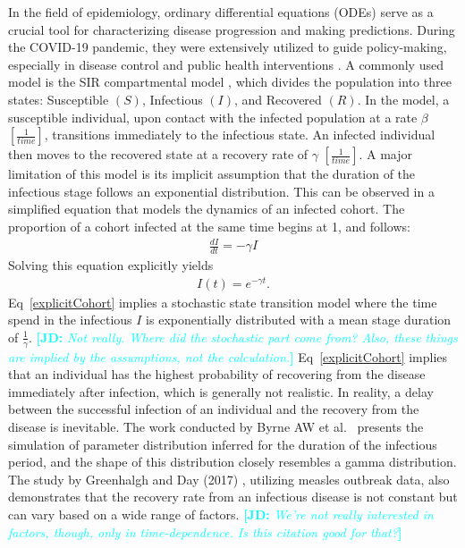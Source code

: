 \documentclass[12pt]{article}
\newcommand{\Eqnref}[1]{Eq~\ref{#1}}
\newcommand{\comment}{\showcomment}
\newcommand{\showcomment}[3]{\textcolor{#1}{\textbf{[#2: }\textsl{#3}\textbf{]}}}
\newcommand{\jd}[1]{\comment{cyan}{JD}{#1}}
\begin{document}
In the field of epidemiology, ordinary differential equations (ODEs) serve as a crucial tool for characterizing disease progression and making predictions. During the COVID-19 pandemic, they were extensively utilized to guide policy-making, especially in disease control and public health interventions \cite{thompson2020epidemiological}. A commonly used model is the SIR compartmental model \cite{Anderson1991}\cite{kermack1927contribution}, which divides the population into three states: Susceptible $(S)$, Infectious $(I)$, and Recovered $(R)$. In the model, a susceptible individual, upon contact with the infected population at a rate $\beta$ $[\frac{1}{\mathit{ time}}]$, transitions immediately to the infectious state. An infected individual then moves to the recovered state at a recovery rate of $\gamma$ $[\frac{1}{\mathit{time}}]$. A major limitation of this model is its implicit assumption that the duration of the infectious stage follows an exponential distribution. This can be observed in a simplified equation that models the dynamics of an infected cohort. The proportion of a cohort infected at the same time begins at 1, and follows:
\begin{align}
    \frac{dI}{dt} = -\gamma I
\end{align}
Solving this equation explicitly yields
\begin{align}
    I(t) = e^{-\gamma t}.
	 \label{explicitCohort}
\end{align}
\Eqnref{explicitCohort} implies a stochastic state transition model where the time spend in the infectious $I$ is exponentially distributed with a mean stage duration of $\frac{1}{\gamma}$. \jd{Not really. Where did the stochastic part come from? Also, these things are implied by the assumptions, not the calculation.}
\Eqnref{explicitCohort} implies that an individual has the highest probability of recovering from the disease immediately after infection, which is generally not realistic. In reality, a delay between the successful infection of an individual and the recovery from the disease is inevitable. The work conducted by Byrne AW et al.~\cite{byrne2020inferred} presents the simulation of parameter distribution inferred for the duration of the infectious period, and the shape of this distribution closely resembles a gamma distribution. The study by Greenhalgh and Day (2017) \cite{greenhalgh2017time}, utilizing measles outbreak data, also demonstrates that the recovery rate from an infectious disease is not constant but can vary based on a wide range of factors. \jd{We're not really interested in factors, though, only in time-dependence. Is this citation good for that?}
\end{document}
